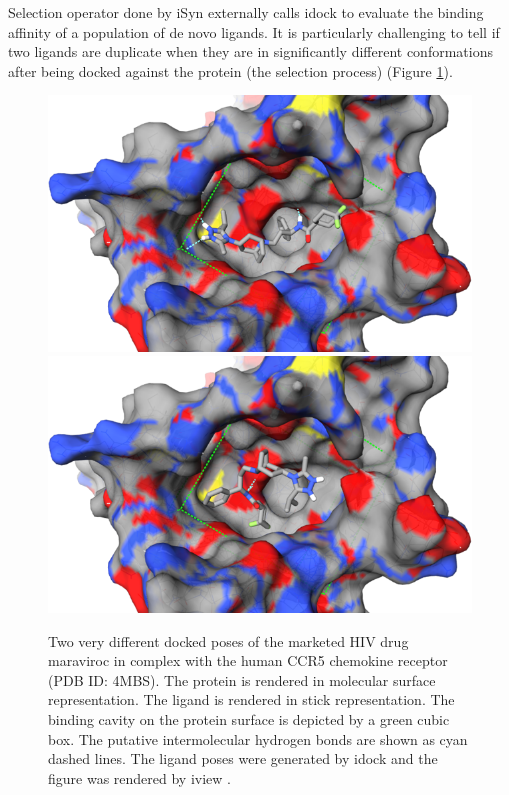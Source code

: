 \documentclass[twocolumn]{svjour3}          %
\begin{document}
Selection operator done by iSyn externally calls idock \cite{1153} to evaluate the binding affinity of a population of de novo ligands. It is particularly challenging to tell if two ligands are duplicate when they are in significantly different conformations after being docked against the protein (the selection process) (Figure \ref{fig:MRV}).

\begin{figure}
\centering
\includegraphics[width=1.36\textwidth,natwidth=638,natheight=386]{../usrt/MRV0.png}
\endminipage
{}
\centering
\includegraphics[width=1.36\textwidth,natwidth=638,natheight=386]{../usrt/MRV1.png}
\endminipage
\caption{Two very different docked poses of the marketed HIV drug maraviroc in complex with the human CCR5 chemokine receptor (PDB ID: 4MBS). The protein is rendered in molecular surface representation. The ligand is rendered in stick representation. The binding cavity on the protein surface is depicted by a green cubic box. The putative intermolecular hydrogen bonds are shown as cyan dashed lines. The ligand poses were generated by idock \cite{1153} and the figure was rendered by iview \cite{1366}.}
\label{fig:MRV}
\end{figure}
\end{document}
